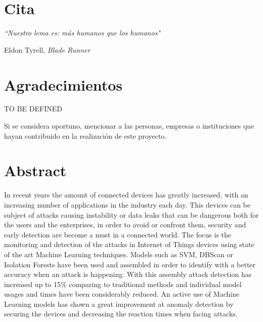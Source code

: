 \chapter*{Cita}

\setlength{}
\setlength\epigraphrule{0pt}

\epigraph{\itshape``Nuestro lema es: más humanos que los humanos"}{Eldon Tyrell, \textit{Blade Runner}}

\chapter*{Agradecimientos}

TO BE DEFINED

Si se considera oportuno, mencionar a las personas, empresas o instituciones que hayan contribuido en la realización de este proyecto.

\chapter*{Abstract}

\onehalfspacing

In recent years the amount of connected devices has greatly increased, with an increasing number of applications in the industry each day. This devices can be subject of attacks causing instability or data leaks that can be dangerous both for the users and the enterprises, in order to avoid or confront them, security and early detection are become a must in a connected world. The focus is the monitoring and detection of the attacks in Internet of Things devices using state of the art Machine Learning techniques. Models such as SVM, DBScan or Isolation Forests have been used and assembled in order to identify with a better accuracy when an attack is happening. With this assembly attack detection has increased up to 15\% comparing to traditional methods and individual model usages and times have been considerably reduced. An active use of Machine Learning models has shown a great improvement at anomaly detection by securing the devices and decreasing the reaction times when facing attacks.

\vspace{1cm}

